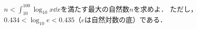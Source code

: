 $n<\int_{10}^{100}\log_{10} x \dd x$を満たす最大の自然数$n$を求めよ．
ただし，$0.434<\log_{10} e< 0.435$（$e$は自然対数の底）である．
